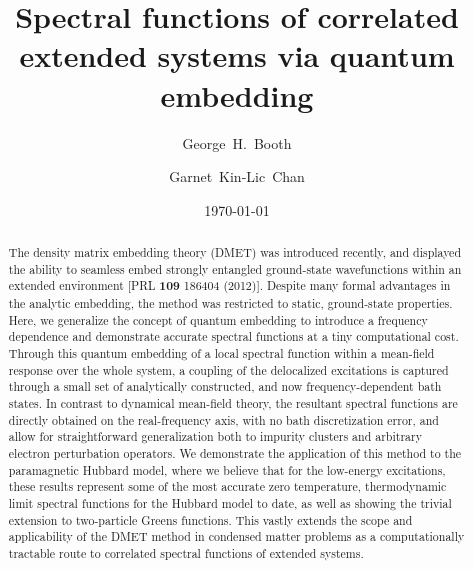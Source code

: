 \documentclass[aps,showpacs,twocolumn,nobibnotes]{revtex4}
\begin{document}
\title{Spectral functions of correlated extended systems via quantum embedding}
\author{George~H.~Booth}
\author{Garnet~Kin-Lic~Chan}  

\begin{abstract}
The density matrix embedding theory (DMET) was introduced recently, and displayed the ability to seamless embed strongly entangled ground-state wavefunctions
within an extended environment [PRL {\bf 109} 186404 (2012)].
Despite many formal advantages in the analytic embedding, the method was restricted to static, ground-state properties.
Here, we generalize the concept of quantum embedding to introduce a frequency dependence and demonstrate accurate spectral functions at a tiny
computational cost. Through this quantum embedding of a local spectral function within a mean-field response over the whole system, 
a coupling of the delocalized excitations is captured through a small set of 
analytically constructed, and now frequency-dependent bath states. In contrast to dynamical mean-field theory, the resultant 
spectral functions are directly obtained on the real-frequency axis, with no bath discretization error, and allow for straightforward generalization both 
to impurity clusters and arbitrary electron perturbation operators. We demonstrate
the application of this method to the paramagnetic Hubbard model, where we believe that for the low-energy excitations, these results represent some of the most accurate 
zero temperature, thermodynamic limit spectral functions for the Hubbard model to date, as well as showing the trivial extension to two-particle Greens functions. 
This vastly extends the scope and applicability 
of the DMET method in condensed matter problems as a computationally tractable route to correlated spectral functions of extended systems.
\end{abstract}
\date{\today}
\maketitle
\end{document}

